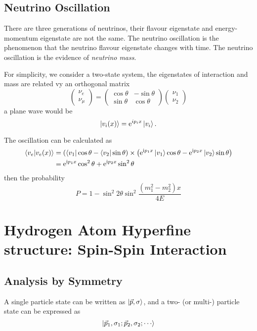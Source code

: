 
\section[中微子震荡]{Neutrino Oscillation}
There are three generations of neutrinos, their flavour eigenstate and energy-momentum eigenstate are not the same. The neutrino oscillation is the phenomenon that the neutrino flavour eigenstate changes with time. The neutrino oscillation is the evidence of \emph{neutrino mass}.

For simplicity, we consider a two-state system, the eigenstates of  interaction and mass are related vy an orthogonal matrix
\begin{equation}
    \begin{pmatrix}
        \nu_e \\ \nu_\mu
    \end{pmatrix}
    =
    \begin{pmatrix}
        \cos\theta & -\sin\theta \\
        \sin\theta & \cos\theta
    \end{pmatrix}
    \begin{pmatrix}
        \nu_1 \\ \nu_2
    \end{pmatrix}
\end{equation}
a plane wave would be 
\begin{equation}
  \ket{v_i(x)} = \mathrm{e}^{i p_i x} \ket{v_i}.
\end{equation}

The oscillation can be calculated as
\begin{align}
  \bra{v_e} \ket{v_e (x)} & = \left( \bra{v_1} \cos \theta - \bra{v_2} \sin \theta \right) \times \left( \mathrm{e}^{\mathrm{i}  p_1 x} \ket{v_1} \cos \theta - \mathrm{e}^{\mathrm{i}  p_2 x} \ket{v_2} \sin \theta \right)
  \\
  & = \mathrm{e}^{\mathrm{i} p_1 x} \cos^{2} \theta + \mathrm{e}^{\mathrm{i} p_2 x} \sin^{2} \theta
\end{align}
then the probability
\begin{equation}
  P = 1 - \sin ^{2} 2\theta \sin ^{2} \frac{\left( m_1^{2} - m_2^{2} \right) x }{4E}
\end{equation}

\chapter[氢原子的超精细结构]{Hydrogen Atom Hyperfine structure: Spin-Spin Interaction}
\section[对称性]{Analysis by Symmetry}

A single particle state can be written as $\ket{\vec{p}, \sigma}$, and a two- (or multi-) particle state can be expressed as 
\begin{equation}
  \ket{\vec{p}_1, \sigma_1; \vec{p}_2, \sigma_2; \cdots}
\end{equation}
